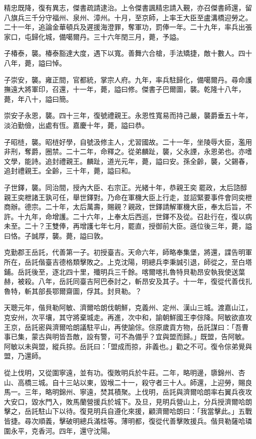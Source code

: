 \begin{pinyinscope}
精忠既降，復有異志，傑書疏請逮治。上令傑書諷精忠請入覲，亦召傑書師還，留八旗兵三千分守福州、泉州、漳州。十月，至京師，上率王大臣至盧溝橋迎勞之。二十一年，追論金華頓兵及遲援海澄罪，奪軍功，罰俸一年。二十九年，率兵出張家口，屯歸化城，備噶爾丹。三十六年閏三月，薨，予謚。

子椿泰，襲。椿泰豁達大度，遇下以寬。善舞六合槍，手法矯捷，敵十數人。四十八年，薨，謚曰悼。

子崇安，襲。雍正間，官都統，掌宗人府。九年，率兵駐歸化，備噶爾丹。尋命護撫遠大將軍印，召還，十一年，薨，謚曰修。傑書子巴爾圖，襲。乾隆十八年，薨，年八十，謚曰簡。

崇安子永恩，襲。四十三年，復號禮親王。永恩性寬易而持己嚴，襲爵垂五十年，淡泊勤儉，出處有恆。嘉慶十年，薨，謚曰恭。

子昭梿，襲。昭梿好學，自號汲修主人，尤習國故。二十一年，坐陵辱大臣，濫用非刑，奪爵，圈禁。二十二年，命釋之。從弟麟趾，襲，父永諲，永恩弟也。亦嗜文學，能詩。追封禮親王。麟趾，道光元年，薨，謚曰安。孫全齡，襲，父錫春，追封禮親王。全齡，三十年，薨，謚曰和。

子世鐸，襲。同治間，授內大臣、右宗正。光緒十年，恭親王奕罷政，太后諮醇親王奕枻諸王孰可任，舉世鐸對。乃命在軍機大臣上行走，並詔緊要事件會同奕枻商辦。德宗。二十年，太后萬壽，賜親？親政，世鐸請解軍機大臣，奉太后旨，不許。十九年，命增護。二十六年，上奉太后西巡，世鐸不及從。召赴行在，復以病未至。二十？王雙俸，再增護七年七月，罷直，授御前大臣。遜位後三年，薨，謚曰恪。子誠厚，襲。薨，謚曰敦。

克勤郡王岳託，代善第一子。初授臺吉。天命六年，師略奉集堡，將還，諜告明軍所在，岳託偕臺吉德格類擊敗之。上克沈陽，明總兵李秉誠引退，師從之，至白塔鋪。岳託後至，逐北四十里，殲明兵三千餘。喀爾喀扎魯特貝勒昂安執我使送葉赫，被殺。八年，岳託同臺吉阿巴泰討之，斬昂安及其子。十一年，復從代善伐扎魯特，斬其部長鄂爾齋圖，俘其。封貝勒。？

天聰元年，偕貝勒阿敏、濟爾哈朗伐朝鮮，克義州、定州、漢山三城。渡嘉山江，克安州，次平壤，其守將棄城走。再進，次中和，諭朝鮮國王李倧降。阿敏欲直攻王京，岳託密與濟爾哈朗議駐平山，再使諭倧。倧原歲貢方物，岳託謀曰：「吾曹事已集，蒙古與明皆吾敵，設有警，可不為備乎？宜與盟而歸。」既盟，告阿敏。阿敏以未與盟，縱兵掠。岳託曰：「盟成而掠，非義也。」勸之不可。復令倧弟覺與盟，乃還師。

從上伐明，又從圍寧遠，並有功。復敗明兵於牛莊。二年，略明邊，隳錦州、杏山、高橋三城。自十三站以東，毀堠二十一，殺守者三十人。師還，上迎勞，賜良馬一。三年，略明錦州、寧遠，焚其積聚。上伐明，岳託與濟爾哈朗率右翼兵夜攻大安口，毀水門入，敗馬蘭營援兵於城下。及旦，見明兵營山上，分兵授濟爾哈朗擊之，岳託駐山下以待。復見明兵自遵化來援，顧濟爾哈朗曰：「我當擊此。」五戰皆捷。尋次順義，擊破明總兵滿桂等。薄明都，復從代善擊敗援兵。偕貝勒薩哈璘圍永平，克香河。四年，還守沈陽。


\end{pinyinscope}
